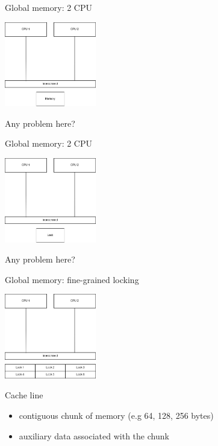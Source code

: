\begin{frame}[t]{Global memory: 2 CPU}

\begin{center}
  \includegraphics[width=0.3\textwidth]{./pics/processor/2.png}
\end{center}

\pause

Any problem here?

\end{frame}

\begin{frame}[t,noframenumbering]{Global memory: 2 CPU}

\begin{center}
  \includegraphics[width=0.3\textwidth]{./pics/processor/3.png}
\end{center}

\pause

Any problem here?

\end{frame}



\begin{frame}[t]{Global memory: fine-grained locking}

\begin{center}
  \includegraphics[width=0.3\textwidth]{./pics/processor/4.png}
\end{center}

\pause

Cache line
\begin{itemize}
    \item contiguous chunk of memory (e.g 64, 128, 256 bytes)
    \item auxiliary data associated with the chunk
\end{itemize}

\end{frame}


